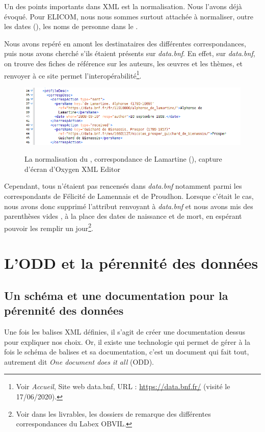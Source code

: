 Un des points importants dans XML est la normalisation. Nous l'avons déjà évoqué. Pour ELICOM, nous nous sommes surtout attachée à normaliser, outre les dates (), les noms de personne dans le . 

Nous avons repéré en amont les destinataires des différentes correspondances, puis nous avons cherché s'ils étaient présents sur \emph{data.bnf}. En effet, sur \emph{data.bnf}, on trouve des fiches de référence sur les auteurs, les œuvres et les thèmes, et renvoyer à ce site permet l'interopérabilité\footnote{Voir \emph{Accueil}, Site web data.bnf, URL : \url{https://data.bnf.fr/} (visité le 17/06/2020).}.
\begin{figure}[ht]
    \centering
    \caption{La normalisation du , correspondance de Lamartine (), capture d'écran d'Oxygen XML Editor}
    \includegraphics[width=16cm]{images/normalisation.png}
    \label{normalisation}
\end{figure}
Cependant, tous n'étaient pas rencensés dans \emph{data.bnf} notamment parmi les correspondants de Félicité de Lamennais et de Proudhon. Lorsque c'était le cas, nous avons donc supprimé l'attribut  renvoyant à \emph{data.bnf} et nous avons mis des parenthèses vides , à la place des dates de naissance et de mort, en espérant pouvoir les remplir un jour\footnote{Voir dans les livrables, les dossiers de remarque des différentes correspondances du Labex OBVIL.}.\\


\section{L'ODD et la pérennité des données}

\subsection{Un schéma et une documentation pour la pérennité des données}
Une fois les balises XML définies, il s'agit de créer une documentation dessus pour expliquer nos choix. Or, il existe une technologie qui permet de gérer à la fois le schéma de balises et sa documentation, c'est un document qui fait tout, autrement dit \emph{One document does it all} (ODD).

